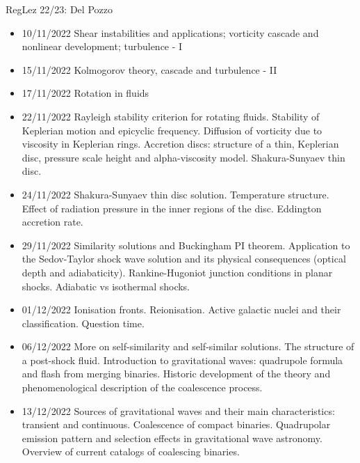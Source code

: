 \begin{wordonframe}{RegLez 22/23: Del Pozzo}
\begin{itemize}
\item 10/11/2022 Shear instabilities and applications; vorticity cascade and nonlinear development; turbulence - I 
\item 15/11/2022 Kolmogorov theory, cascade and turbulence - II 
\item 17/11/2022 Rotation in fluids 
\item 22/11/2022 Rayleigh stability criterion for rotating fluids. Stability of Keplerian motion and epicyclic frequency. Diffusion of vorticity due to viscosity in Keplerian rings. Accretion discs: structure of a thin, Keplerian disc, pressure scale height and alpha-viscosity model. Shakura-Sunyaev thin disc. 
\item 24/11/2022 Shakura-Sunyaev thin disc solution. Temperature structure. Effect of radiation pressure in the inner regions of the disc. Eddington accretion rate. 
\item 29/11/2022 Similarity solutions and Buckingham PI theorem. Application to the Sedov-Taylor shock wave solution and its physical consequences (optical depth and adiabaticity). Rankine-Hugoniot junction conditions in planar shocks. Adiabatic vs isothermal shocks. 
\item 01/12/2022 Ionisation fronts. Reionisation. Active galactic nuclei and their classification. Question time. 
\item 06/12/2022 More on self-similarity and self-similar solutions. The structure of a post-shock fluid. Introduction to gravitational waves: quadrupole formula and flash from merging binaries. Historic development of the theory and phenomenological description of the coalescence process. 
\item 13/12/2022 Sources of gravitational waves and their main characteristics: transient and continuous. Coalescence of compact binaries. Quadrupolar emission pattern and selection effects in gravitational wave astronomy. Overview of current catalogs of coalescing binaries. 
\end{itemize}

\end{wordonframe}
